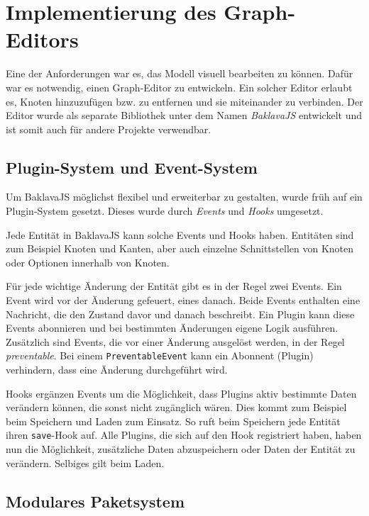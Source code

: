
\chapter{Implementierung des Graph-Editors}
\label{sec:grapheditor}

Eine der Anforderungen war es, das Modell visuell bearbeiten zu können. Dafür war es notwendig, einen Graph-Editor zu entwickeln. Ein solcher Editor erlaubt es, Knoten hinzuzufügen bzw. zu entfernen und sie miteinander zu verbinden. Der Editor wurde als separate Bibliothek unter dem Namen \textit{BaklavaJS} entwickelt und ist somit auch für andere Projekte verwendbar.

\section{Plugin-System und Event-System}

Um BaklavaJS möglichst flexibel und erweiterbar zu gestalten, wurde früh auf ein Plugin-System gesetzt. Dieses wurde durch \textit{Events} und \textit{Hooks} umgesetzt.

Jede Entität in BaklavaJS kann solche Events und Hooks haben. Entitäten sind zum Beispiel Knoten und Kanten, aber auch einzelne Schnittstellen von Knoten oder Optionen innerhalb von Knoten.

Für jede wichtige Änderung der Entität gibt es in der Regel zwei Events. Ein Event wird vor der Änderung gefeuert, eines danach. Beide Events enthalten eine Nachricht, die den Zustand davor und danach beschreibt. Ein Plugin kann diese Events abonnieren und bei bestimmten Änderungen eigene Logik ausführen. Zusätzlich sind Events, die vor einer Änderung ausgelöst werden, in der Regel \textit{preventable}. Bei einem \texttt{PreventableEvent} kann ein Abonnent (Plugin) verhindern, dass eine Änderung durchgeführt wird.

Hooks ergänzen Events um die Möglichkeit, dass Plugins aktiv bestimmte Daten verändern können, die sonst nicht zugänglich wären. Dies kommt zum Beispiel beim Speichern und Laden zum Einsatz. So ruft beim Speichern jede Entität ihren \texttt{save}-Hook auf. Alle Plugins, die sich auf den Hook registriert haben, haben nun die Möglichkeit, zusätzliche Daten abzuspeichern oder Daten der Entität zu verändern. Selbiges gilt beim Laden.

\section{Modulares Paketsystem}

